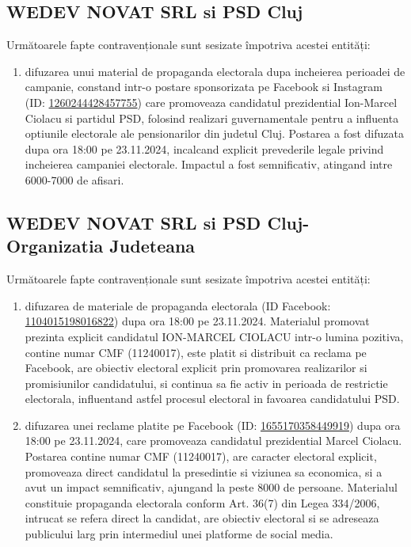\documentclass[a4paper,12pt]{article}
\begin{document}
\vspace{0.5cm}

\subsection{WEDEV NOVAT SRL si PSD Cluj}
Următoarele fapte contravenționale sunt sesizate împotriva acestei entități:

\begin{enumerate}[leftmargin=*, label=\arabic*.)]
    \item difuzarea unui material de propaganda electorala dupa incheierea perioadei de campanie, constand intr-o postare sponsorizata pe Facebook si Instagram (ID: \href{https://www.facebook.com/ads/library/?id=1260244428457755}{1260244428457755}) care promoveaza candidatul prezidential Ion-Marcel Ciolacu si partidul PSD, folosind realizari guvernamentale pentru a influenta optiunile electorale ale pensionarilor din judetul Cluj. Postarea a fost difuzata dupa ora 18:00 pe 23.11.2024, incalcand explicit prevederile legale privind incheierea campaniei electorale. Impactul a fost semnificativ, atingand intre 6000-7000 de afisari.
\end{enumerate}

\vspace{0.5cm}

\subsection{WEDEV NOVAT SRL si PSD Cluj-Organizatia Judeteana}
Următoarele fapte contravenționale sunt sesizate împotriva acestei entități:

\begin{enumerate}[leftmargin=*, label=\arabic*.)]
    \item difuzarea de materiale de propaganda electorala (ID Facebook: \href{https://www.facebook.com/ads/library/?id=1104015198016822}{1104015198016822}) dupa ora 18:00 pe 23.11.2024. Materialul promovat prezinta explicit candidatul ION-MARCEL CIOLACU intr-o lumina pozitiva, contine numar CMF (11240017), este platit si distribuit ca reclama pe Facebook, are obiectiv electoral explicit prin promovarea realizarilor si promisiunilor candidatului, si continua sa fie activ in perioada de restrictie electorala, influentand astfel procesul electoral in favoarea candidatului PSD.
    \item difuzarea unei reclame platite pe Facebook (ID: \href{https://www.facebook.com/ads/library/?id=1655170358449919}{1655170358449919}) dupa ora 18:00 pe 23.11.2024, care promoveaza candidatul prezidential Marcel Ciolacu. Postarea contine numar CMF (11240017), are caracter electoral explicit, promoveaza direct candidatul la presedintie si viziunea sa economica, si a avut un impact semnificativ, ajungand la peste 8000 de persoane. Materialul constituie propaganda electorala conform Art. 36(7) din Legea 334/2006, intrucat se refera direct la candidat, are obiectiv electoral si se adreseaza publicului larg prin intermediul unei platforme de social media.
\end{enumerate}
\end{document}
